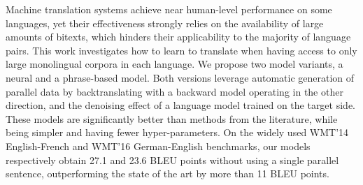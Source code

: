 Machine translation systems achieve near human-level performance on some languages, yet their effectiveness strongly relies on the availability of large amounts of bitexts, which hinders their applicability to the majority of language pairs. This work investigates how to learn to translate when having access to only large monolingual corpora in each language. We propose two model variants, a neural and a phrase-based model. Both versions leverage automatic generation of parallel data by backtranslating with a backward model operating in the other direction, and the denoising effect of a language model trained on the target side. These models are significantly better than methods from the literature, while being simpler and having fewer hyper-parameters. On the widely used WMT'14 English-French and WMT'16 German-English benchmarks, our models respectively obtain 27.1 and 23.6 BLEU points without using a single parallel sentence, outperforming the state of the art by more than 11 BLEU points.
